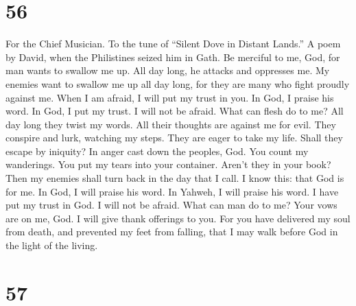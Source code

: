 \hypertarget{section-55}{%
\section{56}\label{section-55}}

For the Chief Musician. To the tune of ``Silent Dove in Distant Lands.''
A poem by David, when the Philistines seized him in Gath. 
Be merciful to me, God, for man wants to swallow me up. All day long, he
attacks and oppresses me.  My enemies want to swallow me
up all day long, for they are many who fight proudly against me.
 When I am afraid, I will put my trust in you.
 In God, I praise his word. In God, I put my trust. I will
not be afraid. What can flesh do to me?  All day long they
twist my words. All their thoughts are against me for evil.
 They conspire and lurk, watching my steps. They are eager
to take my life.  Shall they escape by iniquity? In anger
cast down the peoples, God.  You count my wanderings. You
put my tears into your container. Aren't they in your book?
 Then my enemies shall turn back in the day that I call. I
know this: that God is for me.  In God, I will praise his
word. In Yahweh, I will praise his word.  I have put my
trust in God. I will not be afraid. What can man do to me?
 Your vows are on me, God. I will give thank offerings to
you.  For you have delivered my soul from death, and
prevented my feet from falling, that I may walk before God in the light
of the living.

\hypertarget{section-56}{%
\section{57}\label{section-56}}

